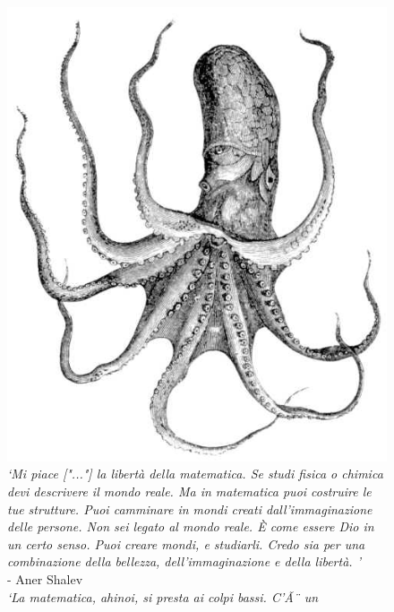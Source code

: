 \documentclass[8pt, a4paper, twocolumn]{extarticle}
\begin{document}
	
\onecolumn
\begin{@twocolumnfalse}
	\clearpage
	\begin{center}
		\begin{figure}[!h]
			\centering
                        \captionsetup{justification=centering}
			\includegraphics[scale=1.7]{colophon/octopus}
			\caption{
                          \textit{`Mi piace ["..."] la libertà della matematica. Se studi fisica 
                            o chimica devi descrivere il mondo reale. Ma in matematica puoi 
                            costruire le tue strutture. Puoi camminare in mondi creati 
                            dall'immaginazione delle persone. Non sei legato al 
			    mondo reale. È come essere Dio in un certo senso. Puoi creare mondi, 
                            e studiarli. Credo sia per una combinazione della bellezza, 
                            dell'immaginazione e della libertà. 
			'}\\- Aner Shalev\\ [\baselineskip]
                          \textit{`La matematica, ahinoi, si presta ai colpi bassi. C'Ã¨ un 
}}
\end{figure}
\end{center}
\end{@twocolumnfalse}
\end{document}
